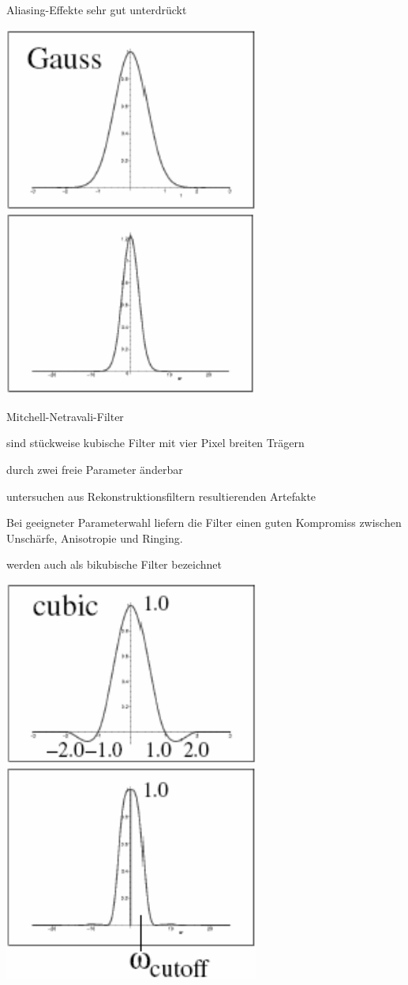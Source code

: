 \documentclass[landscape]{article}
\begin{document}
\begin{multicols}{3}
\begin{description*}
\begin{itemize*}
      \item Aliasing-Effekte sehr gut unterdrückt
      \begin{center}
        \includegraphics[width=.4\linewidth]{Assets/Computergrafik_Gauss-filter1}
        \includegraphics[width=.4\linewidth]{Assets/Computergrafik_Gauss-filter2}
      \end{center}
    \end{itemize*}
    \item[Mitchell-Netravali-Filter]
    \begin{itemize*}
      \item sind stückweise kubische Filter mit vier Pixel breiten Trägern
      \item durch zwei freie Parameter änderbar 
      \item untersuchen aus Rekonstruktionsfiltern resultierenden Artefakte
      \item Bei geeigneter Parameterwahl liefern die Filter einen guten Kompromiss zwischen Unschärfe, Anisotropie und Ringing.
      \item werden auch als bikubische Filter bezeichnet
      \begin{center}
        \includegraphics[width=.4\linewidth]{Assets/Computergrafik_Mitchell-Netravali-Filter1}
        \includegraphics[width=.4\linewidth]{Assets/Computergrafik_Mitchell-Netravali-Filter2}

\end{center}
\end{itemize*}
\end{description*}
\end{multicols}
\end{document}
